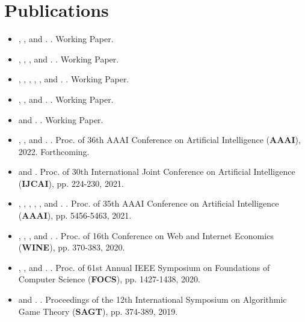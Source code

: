 \documentclass{article}
\newcommand{\link}[2]{\iftoggle{uselinks}{\href{#1}{#2}}{#2}\xspace}
\newcommand{\itlink}[2]{\link{https://daniel-halpern.com/files/#1.pdf}{\textit{#2}}}
\newcommand{\me}{\link{https://daniel-halpern.com}{D. Halpern}}
\newcommand{\nisarg}{\link{https://www.cs.toronto.edu/~nisarg}{N. Shah}}
\newcommand{\vasilis}{\link{https://www.cs.drexel.edu/~gkatz/}{V. Gkatzelis}}
\newcommand{\ariel}{\link{http://procaccia.info}{A. D. Procaccia}}
\newcommand{\alex}{\link{https://www.alexpsomas.com}{A. Psomas}}
\newcommand{\greg}{\link{https://gregorykehne.com}{G. Kehne}}
\newcommand{\dominik}{\link{https://dominik-peters.de}{D. Peters}}
\newcommand{\piotr}{\link{https://www.mimuw.edu.pl/~ps219737/}{P. Skowron}}
\newcommand{\manon}{\link{https://manrev.github.io/manon/}{M. Revel}}
\newcommand{\tao}{\link{https://tao-l.github.io}{T. Lin}}
\newcommand{\jamie}{\link{http://www.jamie.tuckerfoltz.com}{J. Tucker-Foltz}}
\newcommand{\dad}{\link{https://www.cs.cornell.edu/home/halpern/}{J. Y. Halpern}}
\newcommand{\ali}{\link{https://jadbabaie.mit.edu}{A. Jadbabaie}}
\newcommand{\elchanan}{\link{https://math.mit.edu/~elmos/}{E. Mossel}}
\newcommand{\allan}{\link{https://www.cs.toronto.edu/~bor/}{A. Borodin}}
\newcommand{\mohamad}{\link{https://www.cs.toronto.edu/~latifian/}{M. Latifian}}
\newcommand{\bailey}{\link{https://sites.google.com/andrew.cmu.edu/baileyflanigan/home}{B. Flanigan}}
\begin{document}
    \section{Publications}
    \begin{itemize}
        \setlength\itemsep{1.3ex}
        \item \bailey, \me, and \alex. \itlink{smoothed-voting}{A Framework for Smoothed Analysis of Social Choice}. Working Paper.
        \item \allan, \me, \mohamad, and \nisarg. \itlink{distortion-top-t}{Distortion in Voting with Top-t Preferences}. Working Paper. 
        
        \item \me, \dad, \ali, \elchanan, \ariel, and \manon. \itlink{fluid-defense}{In Defense of Fluid Democracy}. Working Paper.
        
        \item \me, \greg, and \jamie. \itlink{buyers-reveal}{Can Buyers Reveal for a Better Deal?}. Working Paper.
        
        \item \me and \ariel. \itlink{unbiased-information}{Unbiased Information Packets}. Working Paper.
        
        \item \manon, \tao, and \me. \itlink{optimal-congress}{How Many Representatives Do We Need? The Optimal Size of an Epistemic Congress}.
        Proc. of 36th AAAI Conference on Artificial Intelligence (\textbf{AAAI}), 2022. Forthcoming. 
        
        \item \me and \nisarg \itlink{distortion-fair-division}{Fair and Efficient Resource Allocation with Partial Information}.
        Proc. of 30th International Joint Conference on Artificial Intelligence (\textbf{IJCAI}), pp. 224-230, 2021. 
        
        \item \me, \greg, \dominik, \ariel, \nisarg, and \piotr. \itlink{ranked-binary-judgments}{Aggregating Binary Judgments Ranked By Accuracy}.
        Proc. of 35th AAAI Conference on Artificial Intelligence (\textbf{AAAI}), pp. 5456-5463, 2021. 

        \item \me, \ariel, \alex, and \nisarg. \itlink{binary-mnw}{Fair Division with Binary Valuations: One
        Rule to Rule
        Them All}. Proc. of 16th Conference on Web and Internet Economics (\textbf{WINE}), pp. 370-383, 2020.
        
        \item \vasilis, \me, and \nisarg. \itlink{optimal-metric-distortion}{Resolving the Optimal Metric Distortion Conjecture}.
        Proc. of 61st Annual IEEE Symposium on Foundations of Computer Science (\textbf{FOCS}), pp. 1427-1438, 2020.

        \item \me and \nisarg. \itlink{fair-division-subsidy-full}{Fair Division with Subsidy}. Proceedings of the 12th International Symposium on
        Algorithmic Game Theory (\textbf{SAGT}), pp. 374-389, 2019.

    \end{itemize}
\end{document}
